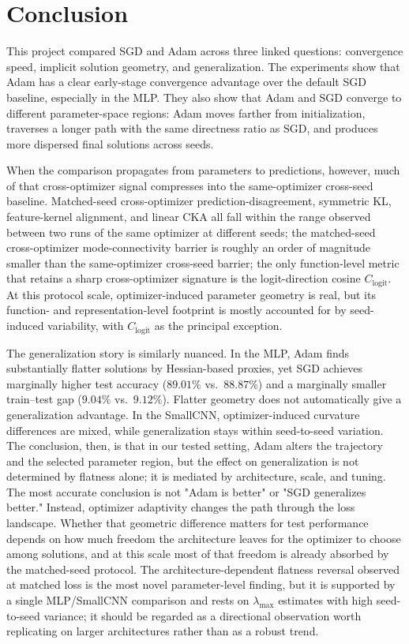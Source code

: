 \documentclass[11pt]{article}
\begin{document}
\section{Conclusion}

This project compared SGD and Adam across three linked questions: convergence speed, implicit solution geometry, and generalization. The experiments show that Adam has a clear early-stage convergence advantage over the default SGD baseline, especially in the MLP. They also show that Adam and SGD converge to different parameter-space regions: Adam moves farther from initialization, traverses a longer path with the same directness ratio as SGD, and produces more dispersed final solutions across seeds.

When the comparison propagates from parameters to predictions, however, much of that cross-optimizer signal compresses into the same-optimizer cross-seed baseline. Matched-seed cross-optimizer prediction-disagreement, symmetric KL, feature-kernel alignment, and linear CKA all fall within the range observed between two runs of the same optimizer at different seeds; the matched-seed cross-optimizer mode-connectivity barrier is roughly an order of magnitude smaller than the same-optimizer cross-seed barrier; the only function-level metric that retains a sharp cross-optimizer signature is the logit-direction cosine $C_{\mathrm{logit}}$. At this protocol scale, optimizer-induced parameter geometry is real, but its function- and representation-level footprint is mostly accounted for by seed-induced variability, with $C_{\mathrm{logit}}$ as the principal exception.

The generalization story is similarly nuanced. In the MLP, Adam finds substantially flatter solutions by Hessian-based proxies, yet SGD achieves marginally higher test accuracy ($89.01\%$ vs.\ $88.87\%$) and a marginally smaller train--test gap ($9.04\%$ vs.\ $9.12\%$). Flatter geometry does not automatically give a generalization advantage. In the SmallCNN, optimizer-induced curvature differences are mixed, while generalization stays within seed-to-seed variation. The conclusion, then, is that in our tested setting, Adam alters the trajectory and the selected parameter region, but the effect on generalization is not determined by flatness alone; it is mediated by architecture, scale, and tuning. The most accurate conclusion is not "Adam is better" or "SGD generalizes better." Instead, optimizer adaptivity changes the path through the loss landscape. Whether that geometric difference matters for test performance depends on how much freedom the architecture leaves for the optimizer to choose among solutions, and at this scale most of that freedom is already absorbed by the matched-seed protocol. The architecture-dependent flatness reversal observed at matched loss is the most novel parameter-level finding, but it is supported by a single MLP/SmallCNN comparison and rests on $\lambda_{\max}$ estimates with high seed-to-seed variance; it should be regarded as a directional observation worth replicating on larger architectures rather than as a robust trend.
\end{document}
